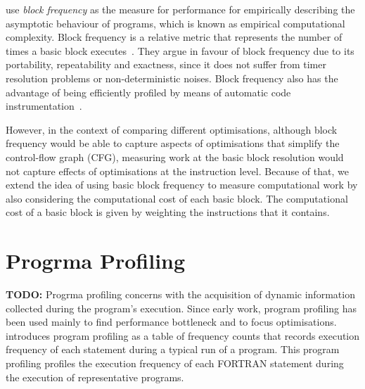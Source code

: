 \cite{goldsmith07} use \textit{block frequency} as the measure for performance for empirically describing the asymptotic behaviour of programs, which is known as empirical computational complexity.
Block frequency is a relative metric that represents the number of times a basic block executes~\citep{ball94,ball96}.
They argue in favour of block frequency due to its portability, repeatability and exactness, since it does not suffer from timer resolution problems or non-deterministic noises.
Block frequency also has the advantage of being efficiently profiled by means of automatic code instrumentation~\citep{knuth73,ball94}.

However, in the context of comparing different optimisations, although block frequency would be able to capture aspects of optimisations that simplify the control-flow graph (CFG), measuring work at the basic block resolution would not capture effects of optimisations at the instruction level.
Because of that, we extend the idea of using basic block frequency to measure computational work by also considering the computational cost of each basic block.
The computational cost of a basic block is given by weighting the instructions that it contains.

\section{Progrma Profiling} \label{subsec:optimalInstrumentation}

\textbf{TODO: }
Progrma profiling concerns with the acquisition of dynamic information collected during the program's execution.
Since early work, program profiling has been used mainly to find performance bottleneck and to focus optimisations.
\cite{knuth71} introduces program profiling as a table of frequency counts that records execution frequency of each statement during a typical run of a program.
This program profiling 
\cite{knuth71} profiles the execution frequency of each FORTRAN statement during the execution of representative programs.


